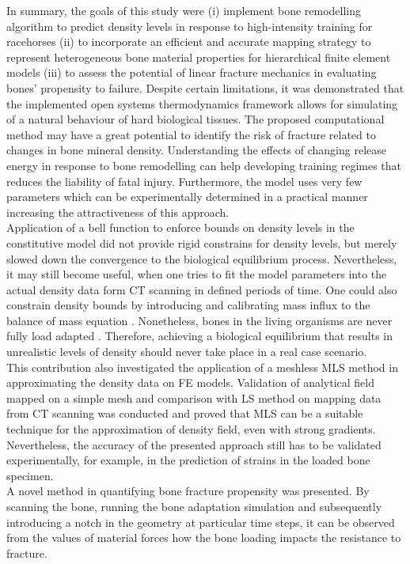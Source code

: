 \documentclass[11pt]{acmeArticle}
\numberwithin{equation}{section}
\begin{document}
In summary, the goals of this study were (i) implement bone remodelling algorithm to predict density levels in response to high-intensity training for racehorses (ii) to incorporate an efficient and accurate mapping strategy to represent heterogeneous bone material properties for hierarchical finite element models (iii) to assess the potential of linear fracture mechanics in evaluating bones' propensity to failure. 
Despite certain limitations, it was demonstrated that the implemented open systems thermodynamics framework allows for simulating of a natural behaviour of hard biological tissues. 
The proposed computational method may have a great potential to identify the risk of fracture related to changes in bone mineral density. 
Understanding the effects of changing release energy in response to bone remodelling can help developing training regimes that reduces the liability of fatal injury. 
Furthermore, the model uses very few parameters which can be experimentally determined in a practical manner increasing the attractiveness of this approach.\\ 
Application of a bell function to enforce bounds on density levels in the constitutive model did not provide rigid constrains for density levels, but merely slowed down the convergence to the biological equilibrium process. 
Nevertheless, it may still become useful, when one tries to fit the model parameters into the actual density data form CT scanning in defined periods of time. 
One could also constrain density bounds by introducing and calibrating mass influx to the balance of mass equation \citep{sharma2013adaptive}. 
Nonetheless, bones in the living organisms are never fully load adapted \citep{christen2014bone}. 
Therefore, achieving a biological equilibrium that results in unrealistic levels of density should never take place in a real case scenario. \\
This contribution also investigated the application of a meshless MLS method in approximating the density data on FE models. Validation of analytical field mapped on a simple mesh and comparison with LS method on mapping data from CT scanning was conducted and proved that MLS can be a suitable technique for the approximation of density field, even with strong gradients. 
Nevertheless, the accuracy of the presented approach still has to be validated experimentally, for example, in the prediction of strains in the loaded bone specimen.  \\
A novel method in quantifying bone fracture propensity was presented. By scanning the bone, running the bone adaptation simulation and subsequently introducing a notch in the geometry at particular time steps, it can be observed from the values of material forces how the bone loading impacts the resistance to fracture. 
\end{document}

